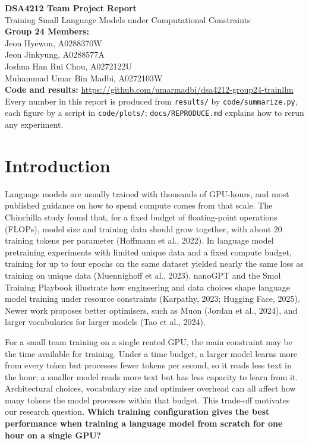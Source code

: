\documentclass[11pt,a4paper]{article}
\begin{document}
\begin{center}
  {\LARGE\bfseries DSA4212 Team Project Report}\\[0.4em]
  {\large Training Small Language Models under Computational Constraints}\\[1em]
  \textbf{Group 24 Members:}\\[0.2em]
  Jeon Hyewon, A0288370W\\
  Jeon Jinkyung, A0288577A\\
  Joshua Han Rui Chou, A0272122U\\
  Muhammad Umar Bin Madbi, A0272103W\\[0.6em]
  \textbf{Code and results:} \url{https://github.com/umarmadbi/dsa4212-group24-trainllm}\\[0.2em]
  {\small Every number in this report is produced from \texttt{results/} by \texttt{code/summarize.py}, each figure by a script in \texttt{code/plots/}; \texttt{docs/REPRODUCE.md} explains how to rerun any experiment.}
\end{center}

\section{Introduction}

Language models are usually trained with thousands of GPU-hours, and most published guidance on how to spend compute comes from that scale. The Chinchilla study found that, for a fixed budget of floating-point operations (FLOPs), model size and training data should grow together, with about 20 training tokens per parameter (Hoffmann et al., 2022). In language model pretraining experiments with limited unique data and a fixed compute budget, training for up to four epochs on the same dataset yielded nearly the same loss as training on unique data (Muennighoff et al., 2023). nanoGPT and the Smol Training Playbook illustrate how engineering and data choices shape language model training under resource constraints (Karpathy, 2023; Hugging Face, 2025). Newer work proposes better optimisers, such as Muon (Jordan et al., 2024), and larger vocabularies for larger models (Tao et al., 2024).

For a small team training on a single rented GPU, the main constraint may be the time available for training. Under a time budget, a larger model learns more from every token but processes fewer tokens per second, so it reads less text in the hour; a smaller model reads more text but has less capacity to learn from it. Architectural choices, vocabulary size and optimiser overhead can all affect how many tokens the model processes within that budget. This trade-off motivates our research question. \textbf{Which training configuration gives the best performance when training a language model from scratch for one hour on a single GPU?}
\end{document}
